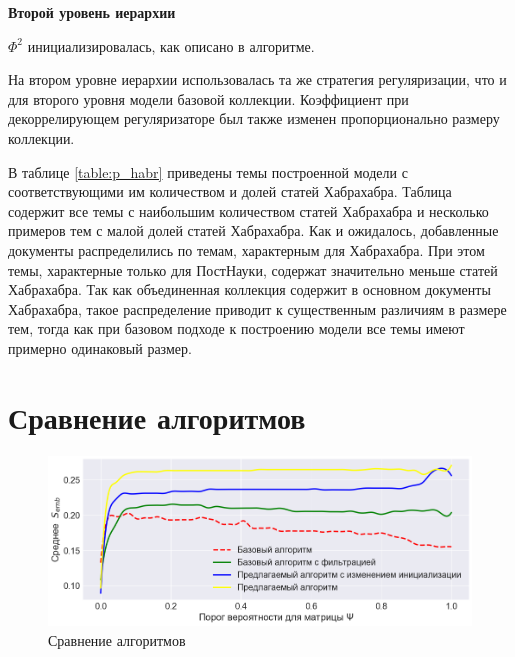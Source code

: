 \textbf{Второй уровень иерархии} 

$\Phi^2$ инициализировалась, как описано в алгоритме.

На втором уровне иерархии использовалась та же стратегия регуляризации, что и для второго уровня модели базовой коллекции. Коэффициент при декоррелирующем регуляризаторе был также изменен пропорционально размеру коллекции. 

В таблице \ref{table:p_habr} приведены темы построенной модели с соответствующими им количеством и долей статей Хабрахабра. Таблица содержит все темы с наибольшим количеством статей Хабрахабра и несколько примеров тем с малой долей статей Хабрахабра. Как и ожидалось, добавленные документы распределились по темам, характерным для Хабрахабра. При этом темы, характерные только для ПостНауки, содержат значительно меньше статей Хабрахабра. Так как объединенная коллекция содержит в основном документы Хабрахабра, такое распределение приводит к существенным различиям в размере тем, тогда как при базовом подходе к построению модели все темы имеют примерно одинаковый размер.

\section{Сравнение алгоритмов}

\begin{figure}[h]
    \centering 
    \includegraphics[width=1\textwidth]{img/alg_comparison.png}
    \caption{\label{fig:alg_comparison}Сравнение алгоритмов}
\end{figure}


